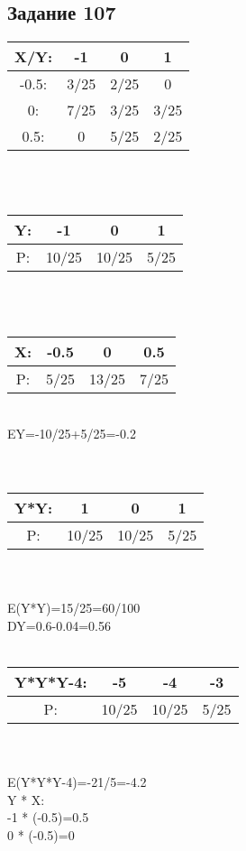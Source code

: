 \documentclass[12pt]{article}
\begin{document}
\subsection{Задание 107}
\begin{tabular}{|c|c|c|c|}
\hline
X/Y: & -1 & 0 & 1 \\
\hline
-0.5: & 3/25 & 2/25 & 0  \\
\hline
0: & 7/25 & 3/25 & 3/25  \\
\hline
0.5: & 0 & 5/25 & 2/25  \\
\hline
\end{tabular}
\\
\\
\begin{tabular}{|c|c|c|c|}
\hline
Y: & -1 & 0 & 1 \\
\hline
P: & 10/25 & 10/25 & 5/25  \\
\hline
\end{tabular}
\\
\\
\begin{tabular}{|c|c|c|c|}
\hline
X: & -0.5 & 0 & 0.5 \\
\hline
P: & 5/25 & 13/25 & 7/25  \\
\hline
\end{tabular}
\\    
EY=-10/25+5/25=-0.2\\
\\
\\
\begin{tabular}{|c|c|c|c|}
\hline
Y*Y: & 1 & 0 & 1 \\
\hline
P: & 10/25 & 10/25 & 5/25  \\
\hline
\end{tabular}
\\
\\
E(Y*Y)=15/25=60/100\\
DY=0.6-0.04=0.56\\
\\
\begin{tabular}{|c|c|c|c|}
\hline
Y*Y*Y-4: & -5 & -4 & -3 \\
\hline
P: & 10/25 & 10/25 & 5/25  \\
\hline
\end{tabular}
\\
\\
E(Y*Y*Y-4)=-21/5=-4.2\\
Y * X:\\
-1 * (-0.5)=0.5\\
0 * (-0.5)=0\\
\end{document}
